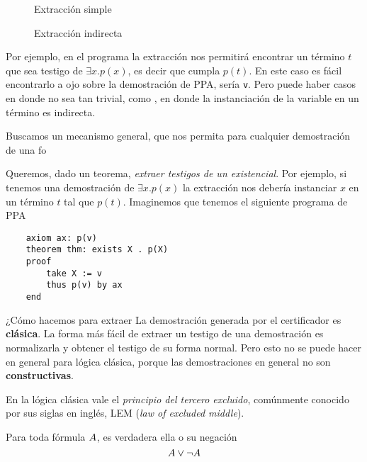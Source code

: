 \begin{multicols}{2}
    \begin{figure}[H]
        
        \caption{Extracción simple}
        \label{fri:prog:exists}
    \end{figure}

    \begin{figure}[H]
        
        \caption{Extracción indirecta}
        \label{fri:prog:indirect}
    \end{figure}
\end{multicols}

Por ejemplo, en el programa  la extracción nos permitirá encontrar un término $t$ que sea testigo de $\exists
x. p(x)$, es decir que cumpla $p(t)$. En este caso es fácil encontrarlo a ojo
sobre la demostración de PPA, sería \lstinline{v}. Pero puede haber casos en
donde no sea tan trivial, como , en donde la
instanciación de la variable en un término es indirecta.

Buscamos un mecanismo
general, que nos permita para cualquier demostración de una fo



Queremos, dado un teorema, \textit{extraer testigos de un existencial}. Por
ejemplo, si tenemos una demostración de $\exists x . p(x)$ la extracción nos
debería instanciar $x$ en un término $t$ tal que $p(t)$. Imaginemos que tenemos
el siguiente programa de PPA

\begin{verbatim}
    axiom ax: p(v)
    theorem thm: exists X . p(X)
    proof
        take X := v
        thus p(v) by ax
    end
\end{verbatim}

¿Cómo hacemos para extraer La demostración generada por el certificador es \textbf{clásica}. La forma más
fácil de extraer un testigo de una demostración es normalizarla y obtener el
testigo de su forma normal. Pero esto no se puede hacer en general para lógica
clásica, porque las demostraciones en general no son \textbf{constructivas}.

En la lógica clásica vale el \textit{principio del tercero excluido}, comúnmente
conocido por sus siglas en inglés, LEM (\textit{law of excluded middle}).

\begin{prop}[LEM] Para toda fórmula $A$, es verdadera ella o su negación
    \[ A \vee \neg A \]
\end{prop}

